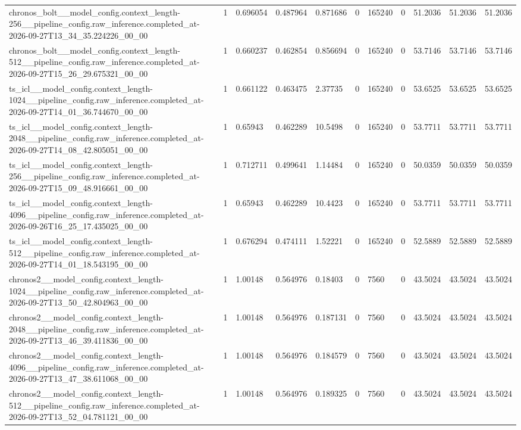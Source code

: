 \begin{tabular}{lllllllllll}
chronos\_bolt\_\_model\_config.context\_length-256\_\_pipeline\_config.raw\_inference.completed\_at-2026-09-27T13\_34\_35.224226\_00\_00 & 1 & 0.696054 & 0.487964 & 0.871686 & 0 & 165240 & 0 & 51.2036 & 51.2036 & 51.2036 \\
chronos\_bolt\_\_model\_config.context\_length-512\_\_pipeline\_config.raw\_inference.completed\_at-2026-09-27T15\_26\_29.675321\_00\_00 & 1 & 0.660237 & 0.462854 & 0.856694 & 0 & 165240 & 0 & 53.7146 & 53.7146 & 53.7146 \\
ts\_icl\_\_model\_config.context\_length-1024\_\_pipeline\_config.raw\_inference.completed\_at-2026-09-27T14\_01\_36.744670\_00\_00 & 1 & 0.661122 & 0.463475 & 2.37735 & 0 & 165240 & 0 & 53.6525 & 53.6525 & 53.6525 \\
ts\_icl\_\_model\_config.context\_length-2048\_\_pipeline\_config.raw\_inference.completed\_at-2026-09-27T14\_08\_42.805051\_00\_00 & 1 & 0.65943 & 0.462289 & 10.5498 & 0 & 165240 & 0 & 53.7711 & 53.7711 & 53.7711 \\
ts\_icl\_\_model\_config.context\_length-256\_\_pipeline\_config.raw\_inference.completed\_at-2026-09-27T15\_09\_48.916661\_00\_00 & 1 & 0.712711 & 0.499641 & 1.14484 & 0 & 165240 & 0 & 50.0359 & 50.0359 & 50.0359 \\
ts\_icl\_\_model\_config.context\_length-4096\_\_pipeline\_config.raw\_inference.completed\_at-2026-09-26T16\_25\_17.435025\_00\_00 & 1 & 0.65943 & 0.462289 & 10.4423 & 0 & 165240 & 0 & 53.7711 & 53.7711 & 53.7711 \\
ts\_icl\_\_model\_config.context\_length-512\_\_pipeline\_config.raw\_inference.completed\_at-2026-09-27T14\_01\_18.543195\_00\_00 & 1 & 0.676294 & 0.474111 & 1.52221 & 0 & 165240 & 0 & 52.5889 & 52.5889 & 52.5889 \\
chronos2\_\_model\_config.context\_length-1024\_\_pipeline\_config.raw\_inference.completed\_at-2026-09-27T13\_50\_42.804963\_00\_00 & 1 & 1.00148 & 0.564976 & 0.18403 & 0 & 7560 & 0 & 43.5024 & 43.5024 & 43.5024 \\
chronos2\_\_model\_config.context\_length-2048\_\_pipeline\_config.raw\_inference.completed\_at-2026-09-27T13\_46\_39.411836\_00\_00 & 1 & 1.00148 & 0.564976 & 0.187131 & 0 & 7560 & 0 & 43.5024 & 43.5024 & 43.5024 \\
chronos2\_\_model\_config.context\_length-4096\_\_pipeline\_config.raw\_inference.completed\_at-2026-09-27T13\_47\_38.611068\_00\_00 & 1 & 1.00148 & 0.564976 & 0.184579 & 0 & 7560 & 0 & 43.5024 & 43.5024 & 43.5024 \\
chronos2\_\_model\_config.context\_length-512\_\_pipeline\_config.raw\_inference.completed\_at-2026-09-27T13\_52\_04.781121\_00\_00 & 1 & 1.00148 & 0.564976 & 0.189325 & 0 & 7560 & 0 & 43.5024 & 43.5024 & 43.5024 \\

\end{tabular}
